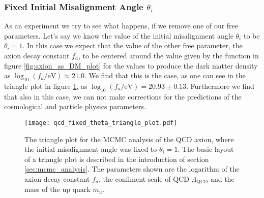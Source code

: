 \documentclass[twoside,a4paper, 12pt]{article}
\numberwithin{equation}{section}
\begin{document}
\subsubsection{Fixed Initial Misalignment Angle $\theta_i$}
As an experiment we try to see what happens, if we remove one of our free
parameters. Let's say we know the value of the initial misalignment angle $\theta_i$ to be $\theta_i = 1$.
In this case we expect that the value of the other free parameter, the axion decay constant $f_a$, to be centered around the value given by the function
in figure \ref{fig:axion_as_DM_plot} for the values to produce the dark matter density as $\log_{10} (f_a / \mathrm{eV}) \approx 21.0$.
We find that this is the case, as one can see in the triangle plot in figure \ref{fig:qcd_fixed_theat_triangle_plot},
as $\log_{10}(f_a / \mathrm{eV}) = 20.93 \pm 0.13$.
Furthermore we find that also in this case, we can not make corrections for the predictions of the cosmological and particle physics parameters.
\begin{figure}[H]
    \centering
    \texttt{[image: qcd\_fixed\_theta\_triangle\_plot.pdf]}
    \caption{The triangle plot for the MCMC analysis of the QCD axion, where the initial misalignment
    angle was fixed to $\theta_i = 1$.
    The basic layout of a triangle plot is described in the introduction of section \ref{sec:mcmc_analysis}.
    The parameters shown are the logarithm of the axion decay constant $f_a$, 
    the confiment scale of QCD $\Lambda_\mathrm{QCD}$ and the mass of the up quark $m_u$.
    }
    \label{fig:qcd_fixed_theat_triangle_plot}
\end{figure}
\end{document}
